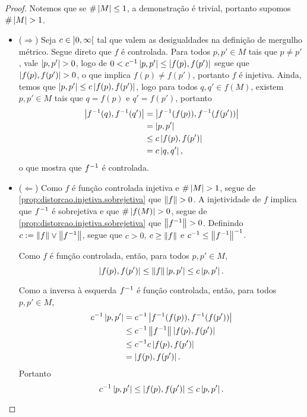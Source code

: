 \begin{proof}
Notemos que se $\#\left\lvert{M}\right\rvert \leq 1$, a demonstração é trivial, portanto supomos $\#\left\lvert{M}\right\rvert > 1$.
	\begin{itemize}
	\item ($\Rightarrow$) Seja $c \in \left]{0},{\infty}\right[$ tal que valem as desigualdades na definição de mergulho métrico. Segue direto que $f$ é controlada. Para todos $p,p' \in M$ tais que $p \neq p'$, vale $\left\vert{p},{p'}\right\vert > 0$, logo de $0 < c^{-1} \left\vert{p},{p'}\right\vert \leq \left\vert{f(p)},{f(p')}\right\vert$ segue que $\left\vert{f(p)},{f(p')}\right\vert>0$, o que implica $f(p) \neq f(p')$, portanto $f$ é injetiva. Ainda, temos que $\left\vert{p},{p'}\right\vert \leq c \left\vert{f(p)},{f(p')}\right\vert$, logo para todos $q,q' \in f(M)$, existem $p,p' \in M$ tais que $q=f(p)$ e $q'=f(p')$, portanto
		\begin{align*}
		\left\vert{f^{-1}(q)},{f^{-1}(q')}\right\vert &= \left\vert{f^{-1}(f(p))},{f^{-1}(f(p'))}\right\vert \\
			&= \left\vert{p},{p'}\right\vert \\
			&\leq c \left\vert{f(p)},{f(p')}\right\vert \\
			&= c \left\vert{q},{q'}\right\vert,
		\end{align*}
	o que mostra que $f^{-1}$ é controlada.

	\item ($\Leftarrow$) Como $f$ é função controlada injetiva e $\#\left\lvert{M}\right\rvert>1$, segue de \ref{prop:distorcao.injetiva.sobrejetiva} que $\left\Vert{f}\right\Vert>0$. A injetividade de $f$ implica que $f^{-1}$ é sobrejetiva e que $\#\left\lvert{f(M)}\right\rvert>0$, segue de \ref{prop:distorcao.injetiva.sobrejetiva} que $\left\Vert{f^{-1}}\right\Vert>0$. Definindo $c := \left\Vert{f}\right\Vert \mathbin{\vee} \left\Vert{f^{-1}}\right\Vert$, segue que $c > 0$, $c \geq \left\Vert{f}\right\Vert$ e $c^{-1} \leq \left\Vert{f^{-1}}\right\Vert^{-1}$.

	Como $f$ é função controlada, então, para todos $p,p' \in M$,
		\begin{equation*}
		\left\vert{f(p)},{f(p')}\right\vert \leq \left\Vert{f}\right\Vert \left\vert{p},{p'}\right\vert \leq c \left\vert{p},{p'}\right\vert.
		\end{equation*}

	Como a inversa à esquerda $f^{-1}$ é função controlada, então, para todos $p,p' \in M$,
		\begin{align*}
		c^{-1} \left\vert{p},{p'}\right\vert &= c^{-1} \left\vert{f^{-1}(f(p))},{f^{-1}(f(p'))}\right\vert \\
			&\leq c^{-1} \left\Vert{f^{-1}}\right\Vert \left\vert{f(p)},{f(p')}\right\vert \\
			&\leq c^{-1} c\left\vert{f(p)},{f(p')}\right\vert \\
			&= \left\vert{f(p)},{f(p')}\right\vert.
		\end{align*}
	Portanto
		\begin{equation*}
		c^{-1} \left\vert{p},{p'}\right\vert \leq \left\vert{f(p)},{f(p')}\right\vert \leq c \left\vert{p},{p'}\right\vert.
		\qedhere
		\end{equation*}
	\end{itemize}
\end{proof}

